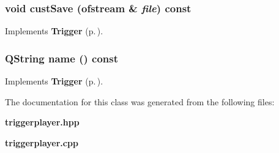 \subsubsection{\setlength{\rightskip}{0pt plus 5cm}void cust\-Save (ofstream \& {\em file}) const\hspace{0.3cm}{\tt  [protected, virtual]}}\label{classTriggerPlayer_b1}




Implements {\bf Trigger} {\rm (p.\,\pageref{classTrigger_b1})}.
\subsubsection{\setlength{\rightskip}{0pt plus 5cm}QString name () const\hspace{0.3cm}{\tt  [virtual]}}\label{classTriggerPlayer_a3}




Implements {\bf Trigger} {\rm (p.\,\pageref{classTrigger_a7})}.

The documentation for this class was generated from the following files:\begin{CompactItemize}
\item 
{\bf triggerplayer.hpp}\item 
{\bf triggerplayer.cpp}\end{CompactItemize}
